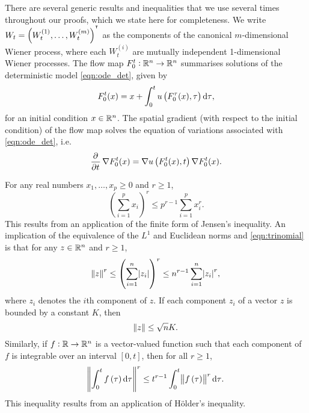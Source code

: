 There are several generic results and inequalities that we use several times throughout our proofs, which we state here for completeness.
We write \(W_t = \left(W_t^{(1)}, \hdots, W_t^{(m)}\right)^{^{\intercal}}\) as the components of the canonical \(m\)-dimensional Wiener process, where each \(W_t^{(i)}\) are mutually independent 1-dimensional Wiener processes.
The flow map \(F_0^t: \mathbb{R}^n \to \mathbb{R}^n\) summarises solutions of the deterministic model \eqref{eqn:ode_det}, given by
\begin{equation}
	F_{0}^{t}(x) = x + \int_{0}^{t}{u\left(F_{0}^{\tau}(x), \tau\right)\dif \tau},
	\label{eqn:flow_map_int}
\end{equation}
for an initial condition \(x \in \mathbb{R}^n\).
The spatial gradient (with respect to the initial condition) of the flow map solves the equation of variations associated with \eqref{eqn:ode_det}, i.e.
\begin{equation}
	\dpd{}{t}\nabla F_0^t(x) = \nabla u\left(F_0^t(x), t\right)\nabla F_0^t(x).
	\label{eqn:eqn_of_vars}
\end{equation}

For any real numbers \(x_1,\hdots,x_p \geq 0\) and \(r \geq 1\),
\begin{equation}
	\left(\sum_{i=1}^p{x_i}\right)^r \leq p^{r-1}\sum_{i=1}^p{x_i^r}.
	\label{eqn:trinomial}
\end{equation}
This results from an application of the finite form of Jensen's inequality.
An implication of the equivalence of the \(L^1\) and Euclidean norms and \eqref{eqn:trinomial} is that for any \(z \in \mathbb{R}^n\) and \(r \geq 1\),
\begin{equation}
	\norm{z}^r \leq \left(\sum_{i = 1}^n{\abs{z_i}}\right)^r \leq n^{r-1}\sum_{i=1}^n{\abs{z_i}^r},
	\label{eqn:norm_trinomial}
\end{equation}
where \(z_i\) denotes the \(i\)th component of \(z\).
If each component \(z_i\) of a vector \(z\) is bounded by a constant \(K\), then
\begin{equation}\label{eqn:bound_vector}
	\norm{z} \leq \sqrt{n} K.
\end{equation}
Similarly, if \(f: \mathbb{R} \to \mathbb{R}^n\) is a vector-valued function such that each component of \(f\) is integrable over an interval \([0,t]\), then for all \(r \geq 1\),
\begin{equation}
	\norm{\int_0^t{f\left(\tau\right)\dif\tau}}^r \leq t^{r-1}\int_0^t{\norm{f\left(\tau\right)}^r\dif\tau}.
	\label{eqn:convex_integral}
\end{equation}
This inequality results from an application of H\"{o}lder's inequality.


